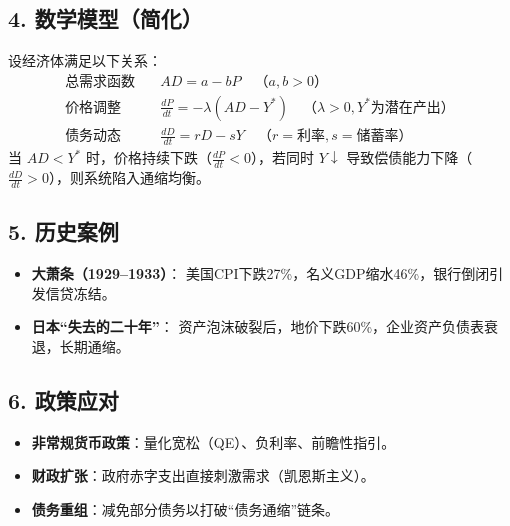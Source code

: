 \subsection*{4. 数学模型（简化）}
设经济体满足以下关系：
\begin{align*}
\text{总需求函数} \quad & AD = a - bP \quad （a,b > 0） \\
\text{价格调整} \quad & \frac{dP}{dt} = -\lambda (AD - Y^*) \quad （\lambda > 0, Y^* \text{为潜在产出）} \\
\text{债务动态} \quad & \frac{dD}{dt} = rD - sY \quad （r=\text{利率}, s=\text{储蓄率）}
\end{align*}
当 
$AD < Y^*$ 时，价格持续下跌（$\frac{dP}{dt} < 0$），若同时 $Y \downarrow$ 导致偿债能力下降（$\frac{dD}{dt} > 0$），则系统陷入通缩均衡。

\subsection*{5. 历史案例}
\begin{itemize}[nosep]
    \item \textbf{大萧条（1929–1933）}：  
    美国CPI下跌27\%，名义GDP缩水46\%，银行倒闭引发信贷冻结。
    \item \textbf{日本“失去的二十年”}：  
    资产泡沫破裂后，地价下跌60\%，企业资产负债表衰退，长期通缩。
\end{itemize}

\subsection*{6. 政策应对}
\begin{itemize}[nosep]
    \item \textbf{非常规货币政策}：量化宽松（QE）、负利率、前瞻性指引。
    \item \textbf{财政扩张}：政府赤字支出直接刺激需求（凯恩斯主义）。
    \item \textbf{债务重组}：减免部分债务以打破“债务通缩”链条。
\end{itemize}

